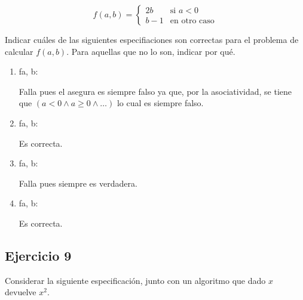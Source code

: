 \[
      f(a, b) = \begin{cases}
            2b    & \text{si } a < 0    \\
            b - 1 & \text{en otro caso}
      \end{cases}
\]

Indicar cuáles de las siguientes especifiaciones son correctas para el problema de calcular $f(a, b)$. Para aquellas que no lo son, indicar por qué.

\begin{enumerate}[label=\alph*)]
      \item \begin{proc}{f}{\In a, b: \float}{\float}
            \end{proc}

            Falla pues el asegura es siempre falso ya que, por la asociatividad, se tiene que $(a < 0 \land a \geq 0 \land \dots)$ lo cual es siempre falso.

      \item \begin{proc}{f}{\In a, b: \float}{\float}
            \end{proc}

            Es correcta.

      \item \begin{proc}{f}{\In a, b: \float}{\float}
            \end{proc}

            Falla pues siempre es verdadera.

      \item \begin{proc}{f}{\In a, b: \float}{\float}
            \end{proc}

            Es correcta.
\end{enumerate}

\subsection{Ejercicio 9}
Considerar la siguiente especificación, junto con un algoritmo que dado $x$ devuelve $x^2$.

